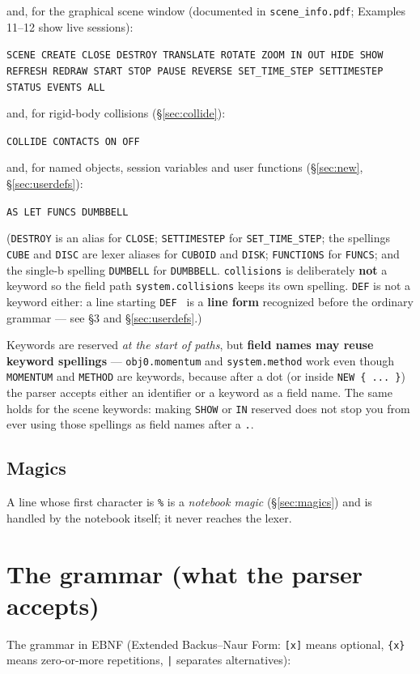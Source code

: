 \documentclass[11pt]{article}
\newcommand{\kw}[1]{\texttt{\uppercase{#1}}}
\newcommand{\code}[1]{\texttt{#1}}
\begin{document}
and, for the graphical scene window (documented in \code{scene\_info.pdf};
Examples 11--12 show live sessions):

\code{SCENE CREATE CLOSE DESTROY TRANSLATE ROTATE ZOOM IN OUT HIDE SHOW
REFRESH REDRAW START STOP PAUSE REVERSE SET\_TIME\_STEP SETTIMESTEP
STATUS EVENTS ALL}

and, for rigid-body collisions (\S\ref{sec:collide}):

\code{COLLIDE CONTACTS ON OFF}

and, for named objects, session variables and user functions
(\S\ref{sec:new}, \S\ref{sec:userdefs}):

\code{AS LET FUNCS DUMBBELL}

(\kw{destroy} is an alias for \kw{close}; \kw{settimestep} for
\kw{set\_time\_step}; the spellings \kw{cube} and \kw{disc} are lexer
aliases for \kw{cuboid} and \kw{disk}; \kw{functions} for \kw{funcs};
and the single-b spelling \kw{dumbell} for \kw{dumbbell}.
\code{collisions} is deliberately \textbf{not} a keyword so the field
path \code{system.collisions} keeps its own spelling. \kw{def} is not
a keyword either: a line starting \code{DEF } is a \textbf{line form}
recognized before the ordinary grammar --- see \S3 and
\S\ref{sec:userdefs}.)

Keywords are reserved \emph{at the start of paths}, but \textbf{field
names may reuse keyword spellings} --- \code{obj0.momentum} and
\code{system.method} work even though \kw{momentum} and \kw{method} are
keywords, because after a dot (or inside \code{NEW \{ ... \}}) the parser
accepts either an identifier or a keyword as a field name. The same
holds for the scene keywords: making \kw{show} or \kw{in} reserved does
not stop you from ever using those spellings as field names after a
\code{.}.

\subsection{Magics}

A line whose first character is \code{\%} is a \emph{notebook magic}
(\S\ref{sec:magics}) and is handled by the notebook itself; it never
reaches the lexer.

\section{The grammar (what the parser accepts)}

The grammar in EBNF (Extended Backus--Naur Form: \code{[x]} means
optional, \code{\{x\}} means zero-or-more repetitions, \code{|} separates
alternatives):
\end{document}
